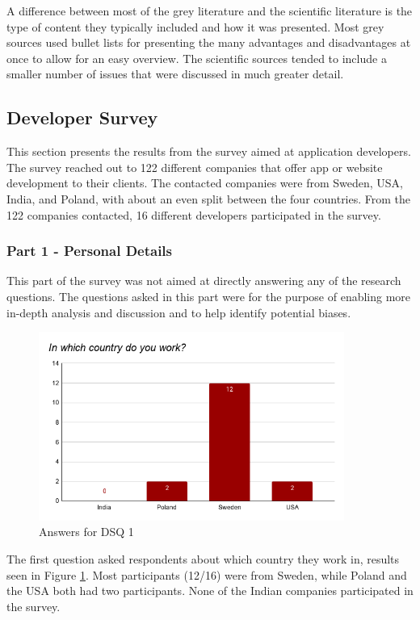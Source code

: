 \documentclass[a4paper,12pt]{article}
\begin{document}
A difference between most of the grey literature and the scientific literature is the type of content they typically included and how it was presented. Most grey sources used bullet lists for presenting the many advantages and disadvantages at once to allow for an easy overview. The scientific sources tended to include a smaller number of issues that were discussed in much greater detail.

\subsection{Developer Survey}
\label{Results_dev}
This section presents the results from the survey aimed at application developers. The survey reached out to 122 different companies that offer app or website development to their clients. The contacted companies were from Sweden, USA, India, and Poland, with about an even split between the four countries. From the 122 companies contacted, 16 different developers participated in the survey.

\subsubsection{Part 1 - Personal Details}
\label{Results_dev_part1}
This part of the survey was not aimed at directly answering any of the research questions. The questions asked in this part were for the purpose of enabling more in-depth analysis and discussion and to help identify potential biases.

\begin{figure}[ht!]
    \centering
    \includegraphics[width=10cm]{img/Results/dsq1.png}
    \caption{Answers for DSQ 1}
    \label{fig:res_devq1}
\end{figure}

The first question asked respondents about which country they work in, results seen in Figure \ref{fig:res_devq1}. Most participants (12/16) were from Sweden, while Poland and the USA both had two participants. None of the Indian companies participated in the survey.
\end{document}
